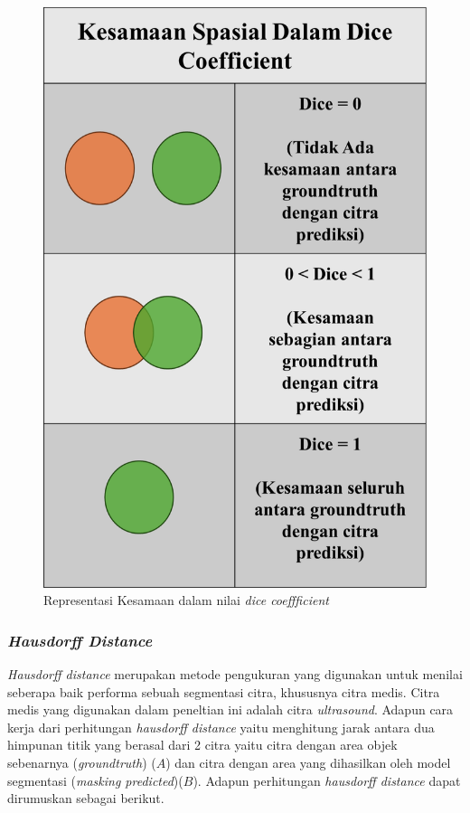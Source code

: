 \begin{figure}[htbp]
	\centering
	\includegraphics[scale= 0.2]{bab2/dice_spasial.png}
	\caption{Representasi Kesamaan dalam nilai \textit{dice coeffficient}}
	\label{fig:dice_spasial}
\end{figure}


\subsubsection{\textit{Hausdorff Distance}}
\textit{Hausdorff distance} merupakan metode pengukuran yang digunakan untuk menilai seberapa baik performa sebuah segmentasi citra, khususnya citra medis. Citra medis yang digunakan dalam peneltian ini adalah citra \textit{ultrasound}. Adapun cara kerja dari perhitungan \textit{hausdorff distance} yaitu menghitung jarak antara dua himpunan titik yang berasal dari 2 citra yaitu citra dengan area objek sebenarnya (\textit{groundtruth}) ($A$) dan citra dengan  area yang dihasilkan oleh model segmentasi (\textit{masking predicted})($B$). Adapun perhitungan \textit{hausdorff distance} dapat dirumuskan sebagai berikut. 

